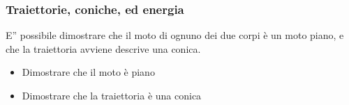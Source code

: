 \documentclass[letterpaper,10pt,italian]{jupyterBook}
\begin{document}
\subsubsection{Traiettorie, coniche, ed energia}
\label{\detokenize{ch/mechanics/dynamics-motion-gravitation:traiettorie-coniche-ed-energia}}\label{\detokenize{ch/mechanics/dynamics-motion-gravitation:physics-hs-mechanics-dynamics-motion-gravitation-two-bodies-energy-and-conics}}
\sphinxAtStartPar
E” possibile dimostrare che il moto di ognuno dei due corpi è un moto piano, e che la traiettoria avviene descrive una conica.
\begin{itemize}
\item {} 
\sphinxAtStartPar
{} Dimostrare che il moto è piano

\item {} 
\sphinxAtStartPar
{} Dimostrare che la traiettoria è una conica

\end{itemize}
\end{document}
